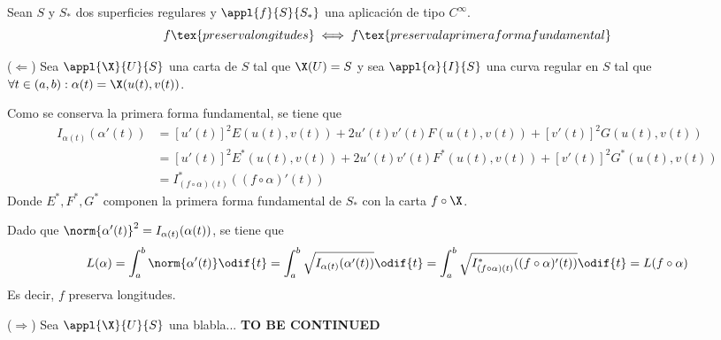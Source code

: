 \begin{lem}
	Sean $S$ y $S_*$ dos superficies regulares y $\appl{f}{S}{S_*}$ una aplicación de tipo $C^\infty$.
	\[f\tex{ preserva longitudes} \iff f \tex{ preserva la primera forma fundamental }\]
	\begin{dem}
		($\Longleftarrow$) Sea $\appl{\X}{U}{S}$ una carta de $S$ tal que $\X(U) = S$ y sea $\appl{\alpha}{I}{S}$ una curva regular en $S$ tal que $\forall t \in (a, b) : \alpha(t) = \X(u(t), v(t))$.

		Como se conserva la primera forma fundamental, se tiene que
		\[\begin{aligned}
				I_{\alpha(t)}(\alpha'(t)) & = \left[u'(t)\right]^2E(u(t), v(t)) + 2u'(t)v'(t)F(u(t), v(t)) + \left[v'(t)\right]^2G(u(t), v(t))       \\
				                          & = \left[u'(t)\right]^2E^*(u(t), v(t)) + 2u'(t)v'(t)F^*(u(t), v(t)) + \left[v'(t)\right]^2G^*(u(t), v(t)) \\
				                          & = I^*_{(f\circ \alpha)(t)}((f\circ\alpha)'(t))
			\end{aligned}\]
		Donde $E^*, F^*, G^*$ componen la primera forma fundamental de $S_*$ con la carta $f\circ\X$.

		Dado que $\norm{\alpha'(t)}^2= I_{\alpha(t)}(\alpha(t))$, se tiene que
		\[L(\alpha) = \int_{a}^{b} \norm{\alpha'(t)} \odif{t} = \int_{a}^{b} \sqrt{I_{\alpha(t)}(\alpha'(t))} \odif{t} = \int_{a}^{b} \sqrt{I^*_{(f\circ \alpha)(t)}((f\circ\alpha)'(t))} \odif{t} = L(f\circ\alpha)\]
		Es decir, $f$ preserva longitudes.

		($\Longrightarrow$) Sea $\appl{\X}{U}{S}$ una blabla... \textbf{TO BE CONTINUED}
	\end{dem}
\end{lem}

